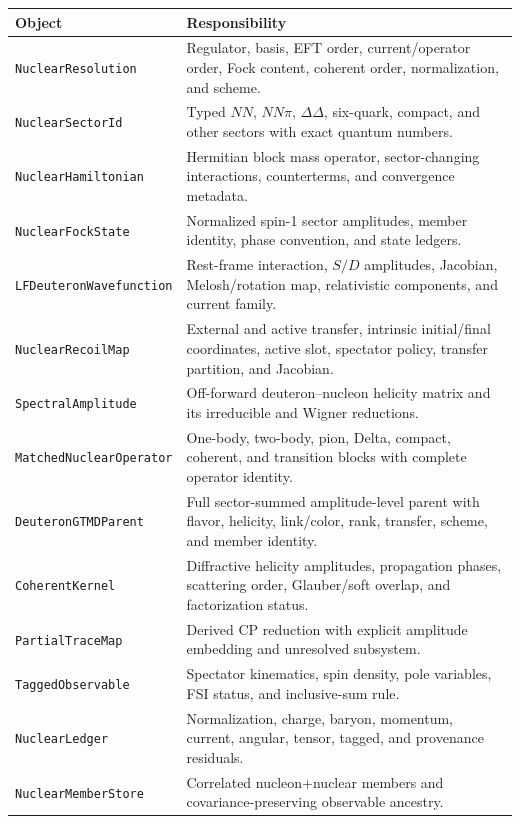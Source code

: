 \documentclass[11pt]{article}
\begin{document}
\begin{longtable}{L{0.27\textwidth}L{0.65\textwidth}}
\toprule
Object & Responsibility\\
\midrule
\endhead
\texttt{NuclearResolution} &
Regulator, basis, EFT order, current/operator order, Fock content, coherent
order, normalization, and scheme.\\
\texttt{NuclearSectorId} &
Typed \(NN\), \(NN\pi\), \(\Delta\Delta\), six-quark, compact, and other
sectors with exact quantum numbers.\\
\texttt{NuclearHamiltonian} &
Hermitian block mass operator, sector-changing interactions, counterterms,
and convergence metadata.\\
\texttt{NuclearFockState} &
Normalized spin-1 sector amplitudes, member identity, phase convention, and
state ledgers.\\
\texttt{LFDeuteronWavefunction} &
Rest-frame interaction, \(S/D\) amplitudes, Jacobian, Melosh/rotation map,
relativistic components, and current family.\\
\texttt{NuclearRecoilMap} &
External and active transfer, intrinsic initial/final coordinates, active
slot, spectator policy, transfer partition, and Jacobian.\\
\texttt{SpectralAmplitude} &
Off-forward deuteron--nucleon helicity matrix and its irreducible and Wigner
reductions.\\
\texttt{MatchedNuclearOperator} &
One-body, two-body, pion, Delta, compact, coherent, and transition blocks with
complete operator identity.\\
\texttt{DeuteronGTMDParent} &
Full sector-summed amplitude-level parent with flavor, helicity, link/color,
rank, transfer, scheme, and member identity.\\
\texttt{CoherentKernel} &
Diffractive helicity amplitudes, propagation phases, scattering order,
Glauber/soft overlap, and factorization status.\\
\texttt{PartialTraceMap} &
Derived CP reduction with explicit amplitude embedding and unresolved
subsystem.\\
\texttt{TaggedObservable} &
Spectator kinematics, spin density, pole variables, FSI status, and
inclusive-sum rule.\\
\texttt{NuclearLedger} &
Normalization, charge, baryon, momentum, current, angular, tensor, tagged,
and provenance residuals.\\
\texttt{NuclearMemberStore} &
Correlated nucleon+nuclear members and covariance-preserving observable
ancestry.\\
\bottomrule
\end{longtable}
\end{document}
